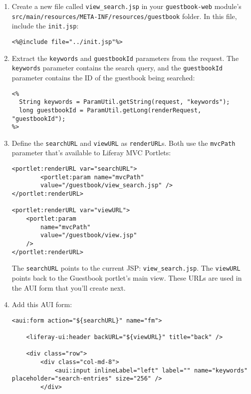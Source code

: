 \begin{enumerate}
\def\labelenumi{\arabic{enumi}.}
\item
  Create a new file called \texttt{view\_search.jsp} in your
  \texttt{guestbook-web} module's
  \texttt{src/main/resources/META-INF/resources/guestbook} folder. In
  this file, include the \texttt{init.jsp}:

\begin{verbatim}
<%@include file="../init.jsp"%>
\end{verbatim}
\item
  Extract the \texttt{keywords} and \texttt{guestbookId} parameters from
  the request. The \texttt{keywords} parameter contains the search
  query, and the \texttt{guestbookId} parameter contains the ID of the
  guestbook being searched:

\begin{verbatim}
<%
  String keywords = ParamUtil.getString(request, "keywords");
  long guestbookId = ParamUtil.getLong(renderRequest, "guestbookId");
%>
\end{verbatim}
\item
  Define the \texttt{searchURL} and \texttt{viewURL} as
  \texttt{renderURL}s. Both use the \texttt{mvcPath} parameter that's
  available to Liferay MVC Portlets:

\begin{verbatim}
<portlet:renderURL var="searchURL">
        <portlet:param name="mvcPath" 
        value="/guestbook/view_search.jsp" />
</portlet:renderURL>

<portlet:renderURL var="viewURL">
    <portlet:param 
        name="mvcPath" 
        value="/guestbook/view.jsp" 
    />
</portlet:renderURL>
\end{verbatim}

  The \texttt{searchURL} points to the current JSP:
  \texttt{view\_search.jsp}. The \texttt{viewURL} points back to the
  Guestbook portlet's main view. These URLs are used in the AUI form
  that you'll create next.
\item
  Add this AUI form:

\begin{verbatim}
<aui:form action="${searchURL}" name="fm">

    <liferay-ui:header backURL="${viewURL}" title="back" />

    <div class="row">
        <div class="col-md-8">
            <aui:input inlineLabel="left" label="" name="keywords" placeholder="search-entries" size="256" />
        </div>


\end{verbatim}
\end{enumerate}
